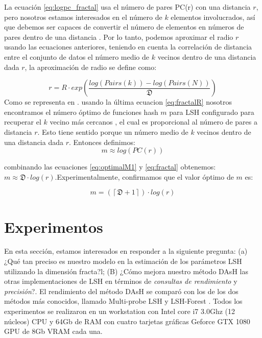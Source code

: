 La ecuación \ref{eq:logpc_fractal} usa el número de pares PC(r) con una distancia $r$, pero nosotros estamos interesados en el número de  $k$ elementos involucrados, así que debemos ser capaces de convertir el número de elementos en números de pares dentro de una distancia \cite{Arantes_thefractal}. Por lo tanto, podemos aproximar el radio $r$ usando las ecuaciones anteriores, teniendo en cuenta la correlación de distancia entre el conjunto de datos el número medio de $k$ vecinos dentro de una distancia dada $r$, la aproximación de radio se define como:

\begin{equation}\label{eq:fractalR}
  r  =  R \cdot  exp (  \frac{log (Pairs (k)) - log (Pairs(N))}{ \mathfrak{D} } )    
\end{equation}
Como se representa en \cite{Arantes_thefractal}.   usando la última ecuacion \ref{eq:fractalR} nosotros encontramos el número óptimo de funciones hash $m$  para \acf{LSH} configurado para recuperar el $k$ vecino más cercanos , el cual es proporcional al número de pares a distancia $r$. Esto tiene sentido porque un número medio de $k$ vecinos dentro de una distancia dada $r$. Entonces definimos:
\begin{equation}\label{eq:optimalM1}
   m \approx log (PC(r)) 
\end{equation}
 
 combinando las ecuaciones \ref{eq:optimalM1} y \ref{eq:fractal} obtenemos: $m \approx \mathfrak{D} \cdot log (r)  $.Experimentalmente, confirmamos que el valor óptimo de $m$ es:

 \begin{equation}\label{eq:fractalm}
    m = (\left\lceil \mathfrak{D} + 1 \right\rceil  ) \cdot  log (r)
 \end{equation}
 
\section{Experimentos}

En esta sección, estamos interesados en responder a la siguiente pregunta: (a) ¿Qué tan preciso es nuestro modelo en la estimación de los parámetros LSH utilizando la dimensión fracta?l; (B) ¿Cómo mejora nuestro método DAsH las otras implementaciones de LSH en términos de \textit{consultas de rendimiento} y \textit{precisión}?. El rendimiento del método DAsH se comparó con los de los dos métodos más conocidos, llamado Multi-probe LSH \cite{multiprobe} y LSH-Forest \cite{lshforest}. Todos los experimentos se realizaron en un workstation con Intel core i7  3.0Ghz (12 núcleos) CPU y 64Gb de RAM con cuatro tarjetas gráficas Geforce GTX 1080 GPU de 8Gb VRAM cada una.
 
